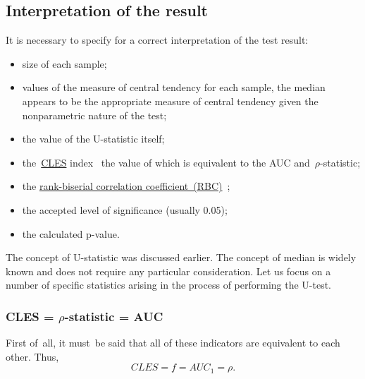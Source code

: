 \documentclass[]{scrreprt}
\begin{document}
\subsection{Interpretation of the result}
It is necessary to specify for a correct interpretation of the test result:
\begin{itemize}
	\item size of each sample;
	\item values of the measure of central tendency for each sample, the median appears to be the appropriate measure of central tendency given the nonparametric nature of the test;
	\item the value of the U-statistic itself;
	\item the~\href{https://en.wikipedia.org/wiki/Effect_size#Common_language_effect_size}{CLES} index~\cite{Wiki:CLES} the value of which is equivalent to the AUC and~$\rho$-statistic;
	\item the \href{https://en.wikipedia.org/wiki/Effect_size#Rank-biserial_correlation}{rank-biserial correlation coefficient~(RBC)}~\cite{Wiki:rank-biserial-correlation};
	\item the accepted level of significance (usually 0.05);
	\item the calculated p-value.
\end{itemize}
The concept of U-statistic was discussed earlier. The concept of median is widely known and does not require any particular consideration. Let us focus on a number of specific statistics arising in the process of performing the U-test. 
\subsubsection{CLES = $\rho$-statistic = AUC}
First of~all, it must~be said that all of these indicators are equivalent to each other. Thus,
\begin{equation}\label{eq:AUC=CLES}
CLES = f = AUC_{1} = \rho.
\end{equation}
\end{document}
